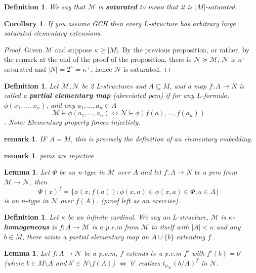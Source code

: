 \documentclass[letterpaper, 12pt]{article}
\newcommand{\fin}{\qquad \quad \hfill \framebox[1.75mm][l]{\,}}
\newcommand{\cM}{\mathcal{M}}
\newcommand{\cN}{\mathcal{N}}
\theoremstyle{stdthm}
\newtheorem{lem}[thm]{Lemma}
\newtheorem{cor}[thm]{Corollary}
\theoremstyle{stddef}
\newtheorem{defn}[thm]{Definition}
\newtheorem{rem}[thm]{remark} %
\theoremstyle{stdnonum}
\theoremstyle{stdqands}
\theoremstyle{stdbold}
\begin{document}
\begin{defn}
We say that $\cM$ is {\bf saturated} to mean that it is $|M|$-saturated.
\end{defn}

\begin{cor}
 If you assume GCH then every $L$-structure has arbitrary large saturated elementary extensions.  
\end{cor}

\begin{proof}
Given $\cM$ and suppose $\kappa \geq |M|$. By the previous proposition, or rather, by the remark at the end of the proof of the proposition, there is $\cN \succeq \cM$, $\cN$ is $\kappa^+$ saturated and $|N| = 2^\kappa = \kappa^+$, hence $\cN$ is saturated. 
\end{proof}

\begin{defn}
Let $\cM,\cN$ be 2 L-structures and $A \subseteq M$, and a map $f: A \to N$ is called a {\bf partial elementary map} (abreviated pem) if for any $L$-formula, $\phi(x_1,\dots, x_n)$, and any $a_1,\dots, a_n \in A$
\[ \cM \models \phi(a_1,\dots, a_n) \Leftrightarrow \cN \models \phi(f(a),\dots, f(a_n))\]. Note: Elementary property forces injectivty. 
\end{defn}

\begin{rem}
IF $A = M$, this is precisely the definition of an elementary embedding. 
\end{rem}

\begin{rem}
pems are injective
\end{rem}

\begin{lem}
Let $\Phi$ be an n-type in $\cM$ over $A$ and let $f: A \to N$ be a pem from $\cM \to \cN$, then 
\[ \Phi(x)^f = \{ \phi(x,f(a)) : \phi(x,a) \in \phi(x,a) \in \Phi, a\in A\}\]
is an $n$-type in $\cN$ over $f(A)$. (proof left as an exercise). 
\end{lem}

\begin{defn}
Let $\kappa$ be an infinite cardinal. We say an L-structure, $\cM$ is {\bf $\kappa$-homogeneous} is $f:A\to \cM$ is a p.e.m from $\cM$ to itself with $|A|<\kappa$ and any $b \in M$, there exists a partial elementary map on $A \cup \{b\}$ extending $f$ . 
\end{defn}

\begin{lem}\label{lem33}
Let $f: A \to \cN$ be a p.e.m, $f$ extends to a p.e.m $f'$ with $f'(b) = b'$ (where $b \in M\setminus A$ and $b' \in N\setminus f(A)$) $\Leftrightarrow$ $b'$ realizes $t_{p_\cM}(b/A)^f $ in $\cN$. 
\end{lem}
\end{document}
